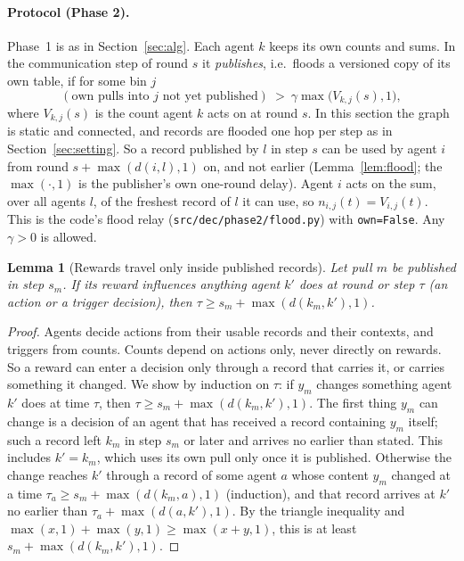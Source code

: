 \documentclass[11pt]{article}
\newtheorem{lemma}[theorem]{Lemma}
\theoremstyle{definition}
\begin{document}
\paragraph{Protocol (Phase 2).} Phase~1 is as in Section~\ref{sec:alg}. Each agent $k$ keeps its own counts and sums.
In the communication step of round $s$ it \emph{publishes}, i.e.\ floods a versioned copy of its own table, if for some
bin $j$
\begin{equation}\label{eq:pubtrigger}
(\text{own pulls into }j\text{ not yet published})\ >\ \gamma\max\big(V_{k,j}(s),1\big),
\end{equation}
where $V_{k,j}(s)$ is the count agent $k$ acts on at round $s$. In this section the graph is static and connected,
and records are flooded one hop per step as in Section~\ref{sec:setting}. So a record published by $l$ in step $s$ can be
used by agent $i$ from round $s+\max(d(i,l),1)$ on, and not earlier (Lemma~\ref{lem:flood}; the $\max(\cdot,1)$ is
the publisher's own one-round delay). Agent $i$ acts on the sum, over all agents
$l$, of the freshest record of $l$ it can use, so $n_{i,j}(t)=V_{i,j}(t)$. This is the code's flood relay
(\texttt{src/dec/phase2/flood.py}) with \texttt{own=False}. Any $\gamma>0$ is allowed.

\begin{lemma}[Rewards travel only inside published records]\label{lem:causal}
Let pull $m$ be published in step $s_m$. If its reward influences anything agent $k'$ does at round or step $\tau$
(an action or a trigger decision), then $\tau\ge s_m+\max(d(k_m,k'),1)$.
\end{lemma}
\begin{proof}
Agents decide actions from their usable records and their contexts, and triggers from counts. Counts depend on actions
only, never directly on rewards. So a reward can enter a decision only through a record that carries it, or carries
something it changed. We show by induction on $\tau$: if $y_m$ changes something agent $k'$ does at time $\tau$, then
$\tau\ge s_m+\max(d(k_m,k'),1)$. The first thing $y_m$ can change is a decision of an agent that has received a record
containing $y_m$ itself; such a record left $k_m$ in step $s_m$ or later and arrives no earlier than stated. This includes
$k'=k_m$, which uses its own pull only once it is published. Otherwise the change reaches $k'$ through a record of some
agent $a$ whose content $y_m$ changed at a time $\tau_a\ge s_m+\max(d(k_m,a),1)$ (induction), and that record arrives at
$k'$ no earlier than $\tau_a+\max(d(a,k'),1)$. By the triangle inequality and $\max(x,1)+\max(y,1)\ge\max(x+y,1)$, this
is at least $s_m+\max(d(k_m,k'),1)$.
\end{proof}
\end{document}
